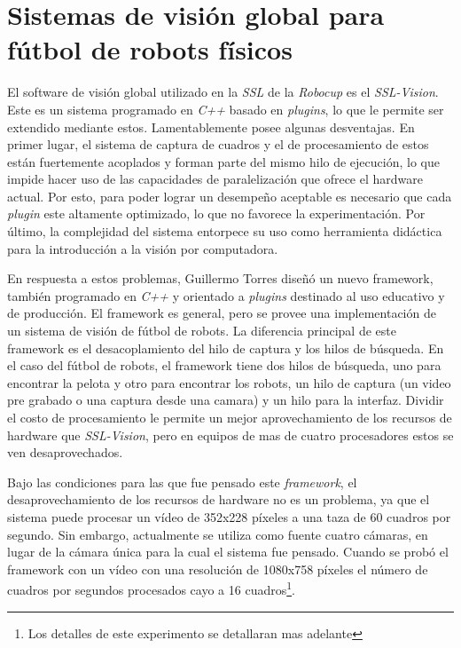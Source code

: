 
\section{Sistemas de visión global para fútbol de robots físicos}


El software de visión global utilizado en la \emph{SSL} de la \emph{Robocup} es
el \emph{SSL-Vision}\cite{sslvision}. Este es un sistema programado en
\emph{C++} basado en \emph{plugins}, lo que le permite ser extendido mediante
estos. Lamentablemente posee algunas desventajas. En primer lugar, el sistema de
captura de cuadros y el de procesamiento de estos están fuertemente acoplados y
forman parte del mismo hilo de ejecución, lo que impide hacer uso de las
capacidades de paralelización que ofrece el hardware actual. Por esto, para
poder lograr un desempeño aceptable es necesario que cada \emph{plugin} este
altamente optimizado, lo que no favorece la experimentación. Por último, la
complejidad del sistema entorpece su uso como herramienta didáctica para la
introducción a la visión por computadora.

En respuesta a estos problemas, Guillermo Torres\cite{torres2014} diseñó un
nuevo framework, también programado en \emph{C++} y orientado a \emph{plugins}
destinado al uso educativo y de producción. El framework es general, pero se
provee una implementación de un sistema de visión de fútbol de robots. La
diferencia principal de este framework es el desacoplamiento del hilo de captura
y los hilos de búsqueda. En el caso del fútbol de robots, el framework tiene dos
hilos de búsqueda, uno para encontrar la pelota y otro para encontrar los
robots, un hilo de captura (un video pre grabado o una captura desde una camara)
y un hilo para la interfaz. Dividir el costo de procesamiento le permite un
mejor aprovechamiento de los recursos de hardware que \emph{SSL-Vision}, pero en
equipos de mas de cuatro procesadores estos se ven desaprovechados.

Bajo las condiciones para las que fue pensado este \emph{framework}, el
desaprovechamiento de los recursos de hardware no es un problema, ya que el
sistema puede procesar un vídeo de 352x228 píxeles a una taza de 60 cuadros por
segundo. Sin embargo, actualmente se utiliza como fuente cuatro cámaras, en
lugar de la cámara única para la cual el sistema fue pensado. Cuando se probó el
framework con un vídeo con una resolución de 1080x758 píxeles el número de
cuadros por segundos procesados cayo a 16 cuadros\footnote{Los detalles de este
experimento se detallaran mas adelante}.
